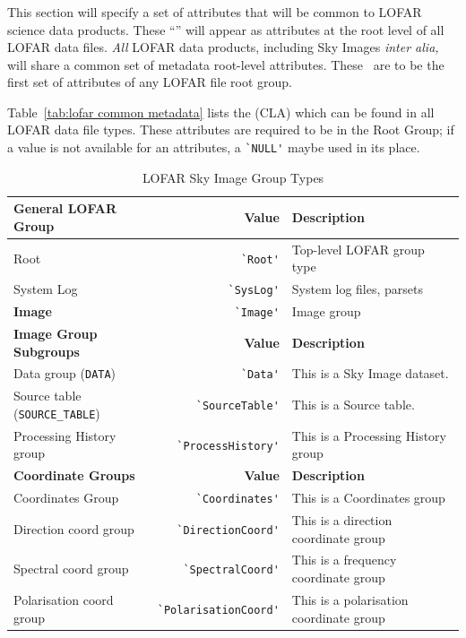 \documentclass[a4paper,10pt,bibtotoc]{scrartcl}
\begin{document}
\subsubsection{\cla}
\label{sec:common lofar attributes}

This section will specify a set of attributes that will be common to
LOFAR science data products.  These ``\cla'' will
appear as attributes at the root level of all LOFAR data files.
\textit{All} LOFAR data products, including Sky Images \textit{inter
  alia,} will share a common set of metadata root-level attributes.
These \cla\ are to be the first set of attributes of
any LOFAR file root group.

Table~\ref{tab:lofar common metadata} lists the {\cla} (CLA) which can
be found in all LOFAR data file types. These attributes are required
to be in the Root Group; if a value is not available for an
attributes, a \verb|`NULL'| maybe used in its place.



\begin{table}[htbp]
  \centering
  \begin{tabular}{|lrp{6cm}|}
    \hline
    \sc \textbf{General LOFAR Group} & \sc \textbf{Value} & \textbf{Description} \\
    \hline
    Root           & \verb|`Root'|   & Top-level LOFAR group type \\
    System Log     & \verb|`SysLog'| & System log files, parsets \\
    \textbf{Image} & \verb|`Image'|  & Image group \\
    \hline \hline
    \sc \textbf{Image Group Subgroups} & \textbf{Value} & \textbf{Description} \\
    \hline
    Data group (\verb|DATA|)   & \verb|`Data'| & This is a Sky Image dataset. \\
    Source table (\verb|SOURCE_TABLE|) & \verb|`SourceTable'| & This is a Source table. \\
    Processing History group &\verb|`ProcessHistory'| & This is a
    Processing History group \\
    \hline
    \hline
    \sc \textbf{Coordinate Groups} & \textbf{Value} & \textbf{Description} \\
    \hline
    Coordinates Group        & \verb|`Coordinates'|
                             & This is a Coordinates group \\
    Direction coord group    & \verb|`DirectionCoord'|
                             & This is a direction coordinate group \\
    Spectral coord group     & \verb|`SpectralCoord'|
                             & This is a frequency coordinate group \\
    Polarisation coord group & \verb|`PolarisationCoord'|
                             & This is a polarisation coordinate group \\
    \hline
  \end{tabular}
  \caption{LOFAR Sky Image Group Types}
  \label{tab:group types}
\end{table}
\end{document}
